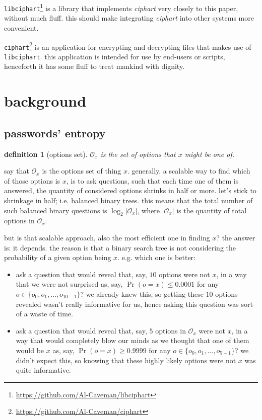 \documentclass[twocolumn]{article}
\newtheorem{definition}{definition}[section]
\begin{document}
\texttt{libciphart}\footnote{\url{https://github.com/Al-Caveman/libciphart}}
is a library that implements \emph{ciphart} very closely to this paper,
without much fluff.  this should make integrating \emph{ciphart} into other
systems more convenient.

\texttt{ciphart}\footnote{\url{https://github.com/Al-Caveman/ciphart}} is
an application for encrypting and decrypting files that makes use of
\texttt{libciphart}.  this application is intended for use by end-users or
scripts, henceforth it has some fluff to treat mankind with dignity.

\break
\tableofcontents

\section{background}
\subsection{passwords' entropy}\label{sec_pass_entropy}
\begin{definition}[options set]
    $\mathcal{O}_x$ is the set of options that $x$ might be one of.
\end{definition}

say that $\mathcal{O}_x$ is the options set of thing $x$.  generally, a
scalable way to find which of those options is $x$, is to ask questions,
such that each time one of them is answered, the quantity of considered
options shrinks in half or more.  let's stick to shrinkage in half; i.e.
balanced binary trees.  this means that the total number of such balanced
binary questions is $\log_2 |\mathcal{O}_x|$, where $|\mathcal{O}_x|$ is
the quantity of total options in $\mathcal{O}_x$.

but is that scalable approach, also the most efficient one in finding $x$?
the answer is: it depends.  the reason is that a binary search tree is not
considering the probability of a given option being $x$.  e.g. which one is
better:
\begin{itemize}
    \item ask a question that would reveal that, say, $10$ options were not
    $x$, in a way that we were not surprised  as, say, $\Pr(o = x) \le
    0.0001$ for any $o \in \{o_0, o_1, \ldots, o_{10-1}\}$?  we already
    knew this, so getting these $10$ options revealed wasn't really
    informative for us, hence asking this question was sort of a waste of
    time.

    \item ask a question that would reveal that, say, $5$ options in
    $\mathcal{O}_x$ were not $x$, in a way that would completely blow our
    minds as we thought that one of them would be $x$ as, say, $\Pr(o = x)
    \ge 0.9999$ for any $o \in \{o_0, o_1, \ldots, o_{5-1}\}$?  we didn't
    expect this, so knowing that these highly likely options were not $x$
    was quite informative.
\end{itemize}
\end{document}
